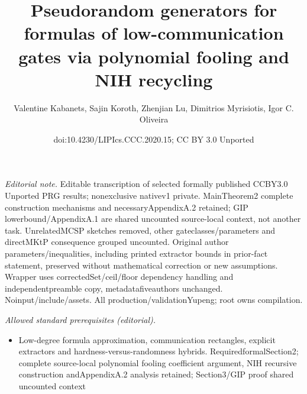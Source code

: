 \documentclass[10pt,a4paper]{article}
\title{Pseudorandom generators for formulas of low-communication gates via polynomial fooling and NIH recycling}
\author{Valentine Kabanets, Sajin Koroth, Zhenjian Lu, Dimitrios Myrisiotis, Igor C. Oliveira}
\date{doi:10.4230/LIPIcs.CCC.2020.15; CC BY 3.0 Unported}
\begin{document}
\maketitle
\noindent\textit{Editorial note.} Editable transcription of selected formally published CCBY3.0 Unported PRG results; nonexclusive nativev1 private. MainTheorem2 complete construction mechanisms and necessaryAppendixA.2 retained; GIP lowerbound/AppendixA.1 are shared uncounted source-local context, not another task. UnrelatedMCSP sketches removed, other gateclasses/parameters and directMKtP consequence grouped uncounted. Original author parameters/inequalities, including printed extractor bounds in prior-fact statement, preserved without mathematical correction or new assumptions. Wrapper uses correctedSet/ceil/floor dependency handling and independentpreamble copy, metadatafiveauthors unchanged. Noinput/include/assets. All production/validationYupeng; root owns compilation.\par\medskip
\noindent\textit{Allowed standard prerequisites (editorial).}\begin{itemize}
\item Low-degree formula approximation, communication rectangles, explicit extractors and hardness-versus-randomness hybrids. RequiredformalSection2; complete source-local polynomial fooling coefficient argument, NIH recursive construction andAppendixA.2 analysis retained; Section3/GIP proof shared uncounted context
\end{itemize}\medskip
\setcounter{theorem}{1}
\end{document}
